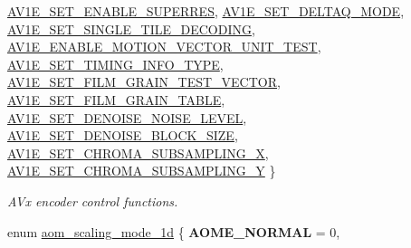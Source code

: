 \begin{DoxyCompactItemize}
\hyperlink{group__aom__encoder_ggae78dde67a6d78f332e9bdba0dde42db5a86e399de03aa825bb7e594e3df1bf71b}{A\+V1\+E\+\_\+\+S\+E\+T\+\_\+\+E\+N\+A\+B\+L\+E\+\_\+\+S\+U\+P\+E\+R\+R\+ES}, 
\hyperlink{group__aom__encoder_ggae78dde67a6d78f332e9bdba0dde42db5ad26eda6211bf3d5fe4f5999ec52b264b}{A\+V1\+E\+\_\+\+S\+E\+T\+\_\+\+D\+E\+L\+T\+A\+Q\+\_\+\+M\+O\+DE}, 
\newline
\hyperlink{group__aom__encoder_ggae78dde67a6d78f332e9bdba0dde42db5af341538631ffe2ac2b562c8b5336a10a}{A\+V1\+E\+\_\+\+S\+E\+T\+\_\+\+S\+I\+N\+G\+L\+E\+\_\+\+T\+I\+L\+E\+\_\+\+D\+E\+C\+O\+D\+I\+NG}, 
\hyperlink{group__aom__encoder_ggae78dde67a6d78f332e9bdba0dde42db5a0c45a2184ff7068f470cb9f128c3605d}{A\+V1\+E\+\_\+\+E\+N\+A\+B\+L\+E\+\_\+\+M\+O\+T\+I\+O\+N\+\_\+\+V\+E\+C\+T\+O\+R\+\_\+\+U\+N\+I\+T\+\_\+\+T\+E\+ST}, 
\hyperlink{group__aom__encoder_ggae78dde67a6d78f332e9bdba0dde42db5a857e822046c62a4c774b1d16c4e453dd}{A\+V1\+E\+\_\+\+S\+E\+T\+\_\+\+T\+I\+M\+I\+N\+G\+\_\+\+I\+N\+F\+O\+\_\+\+T\+Y\+PE}, 
\hyperlink{group__aom__encoder_ggae78dde67a6d78f332e9bdba0dde42db5a437e6b282a2395b4b08a9acde3e41cfb}{A\+V1\+E\+\_\+\+S\+E\+T\+\_\+\+F\+I\+L\+M\+\_\+\+G\+R\+A\+I\+N\+\_\+\+T\+E\+S\+T\+\_\+\+V\+E\+C\+T\+OR}, 
\newline
\hyperlink{group__aom__encoder_ggae78dde67a6d78f332e9bdba0dde42db5ad5846c6f49d37e65a03c39e68d487097}{A\+V1\+E\+\_\+\+S\+E\+T\+\_\+\+F\+I\+L\+M\+\_\+\+G\+R\+A\+I\+N\+\_\+\+T\+A\+B\+LE}, 
\hyperlink{group__aom__encoder_ggae78dde67a6d78f332e9bdba0dde42db5a54fe460f126a7566aa627cd82826faf0}{A\+V1\+E\+\_\+\+S\+E\+T\+\_\+\+D\+E\+N\+O\+I\+S\+E\+\_\+\+N\+O\+I\+S\+E\+\_\+\+L\+E\+V\+EL}, 
\hyperlink{group__aom__encoder_ggae78dde67a6d78f332e9bdba0dde42db5ae113c7e68a6c39b872a268ed6cdf6d10}{A\+V1\+E\+\_\+\+S\+E\+T\+\_\+\+D\+E\+N\+O\+I\+S\+E\+\_\+\+B\+L\+O\+C\+K\+\_\+\+S\+I\+ZE}, 
\hyperlink{group__aom__encoder_ggae78dde67a6d78f332e9bdba0dde42db5a283dd3f4387e5f3a754fea0d206b1cb0}{A\+V1\+E\+\_\+\+S\+E\+T\+\_\+\+C\+H\+R\+O\+M\+A\+\_\+\+S\+U\+B\+S\+A\+M\+P\+L\+I\+N\+G\+\_\+X}, 
\newline
\hyperlink{group__aom__encoder_ggae78dde67a6d78f332e9bdba0dde42db5a501a9453d5790f32c001e9877d3db40c}{A\+V1\+E\+\_\+\+S\+E\+T\+\_\+\+C\+H\+R\+O\+M\+A\+\_\+\+S\+U\+B\+S\+A\+M\+P\+L\+I\+N\+G\+\_\+Y}
 \}\begin{DoxyCompactList}\small\item\em A\+Vx encoder control functions. \end{DoxyCompactList}
\item 
enum \hyperlink{group__aom__encoder_ga2a1791d26fca39303154f0f9ece3e295}{aom\+\_\+scaling\+\_\+mode\+\_\+1d} \{ {\bfseries A\+O\+M\+E\+\_\+\+N\+O\+R\+M\+AL} = 0, 

\end{DoxyCompactItemize}
